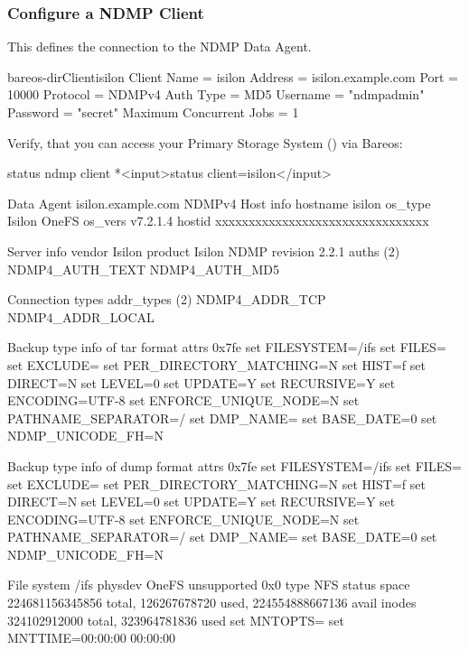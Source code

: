 \subsubsection{Configure a NDMP Client}

This defines the connection to the NDMP Data Agent.

\begin{bareosConfigResource}{bareos-dir}{Client}{isilon}
Client {
  Name = isilon
  Address = isilon.example.com
  Port = 10000
  Protocol = NDMPv4
  Auth Type = MD5
  Username = "ndmpadmin"
  Password = "secret"
  Maximum Concurrent Jobs = 1
}
\end{bareosConfigResource}

Verify, that you can access your Primary Storage System (\TapeAgent) via Bareos:

\begin{bconsole}{status ndmp client}
*<input>status client=isilon</input>

Data Agent isilon.example.com NDMPv4
  Host info
    hostname   isilon
    os_type    Isilon OneFS
    os_vers    v7.2.1.4
    hostid     xxxxxxxxxxxxxxxxxxxxxxxxxxxxxxxx

  Server info
    vendor     Isilon
    product    Isilon NDMP
    revision   2.2.1
    auths      (2) NDMP4_AUTH_TEXT NDMP4_AUTH_MD5

  Connection types
    addr_types (2) NDMP4_ADDR_TCP NDMP4_ADDR_LOCAL

  Backup type info of tar format
    attrs      0x7fe
    set        FILESYSTEM=/ifs
    set        FILES=
    set        EXCLUDE=
    set        PER_DIRECTORY_MATCHING=N
    set        HIST=f
    set        DIRECT=N
    set        LEVEL=0
    set        UPDATE=Y
    set        RECURSIVE=Y
    set        ENCODING=UTF-8
    set        ENFORCE_UNIQUE_NODE=N
    set        PATHNAME_SEPARATOR=/
    set        DMP_NAME=
    set        BASE_DATE=0
    set        NDMP_UNICODE_FH=N

  Backup type info of dump format
    attrs      0x7fe
    set        FILESYSTEM=/ifs
    set        FILES=
    set        EXCLUDE=
    set        PER_DIRECTORY_MATCHING=N
    set        HIST=f
    set        DIRECT=N
    set        LEVEL=0
    set        UPDATE=Y
    set        RECURSIVE=Y
    set        ENCODING=UTF-8
    set        ENFORCE_UNIQUE_NODE=N
    set        PATHNAME_SEPARATOR=/
    set        DMP_NAME=
    set        BASE_DATE=0
    set        NDMP_UNICODE_FH=N

  File system /ifs
    physdev    OneFS
    unsupported 0x0
    type       NFS
    status
    space      224681156345856 total, 126267678720 used, 224554888667136 avail
    inodes     324102912000 total, 323964781836 used
    set        MNTOPTS=
    set        MNTTIME=00:00:00 00:00:00
\end{bconsole}




